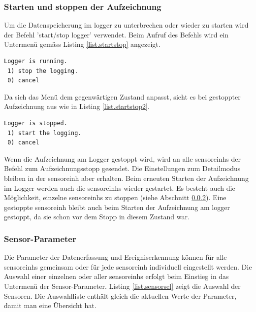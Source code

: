 \begin{lstlisting}[caption=Untermenü Logger-Status, label=list.loggerstatus]

\end{lstlisting}


\subsubsection{Starten und stoppen der Aufzeichnung}\label{sssec.startstop}
Um die Datenspeicherung im \gls{logger} zu unterbrechen oder wieder zu starten wird der Befehl 'start/stop logger' verwendet. Beim Aufruf des Befehls wird ein Untermenü gemäss Listing \ref{list.startstop} angezeigt.

\begin{lstlisting}[caption=Untermenü Stoppen der Aufzeichnung, label=list.startstop1]
 Logger is running.
 1) stop the logging.
 0) cancel
\end{lstlisting}

Da sich das Menü dem gegenwärtigen Zustand anpasst, sieht es bei gestoppter Aufzeichnung aus wie in Listing \ref{list.startstop2}.

\begin{lstlisting}[caption=Untermenü Starten der Aufzeichnung, label=list.startstop2]
 Logger is stopped.
 1) start the logging.
 0) cancel
\end{lstlisting}

Wenn die Aufzeichnung am Logger gestoppt wird, wird an alle \glspl{sensoreinh} der Befehl zum Aufzeichnungsstopp gesendet. Die Einstellungen zum Detailmodus bleiben in der \gls{sensoreinh} aber erhalten. Beim erneuten Starten der Aufzeichnung im Logger werden auch die \glspl{sensoreinh} wieder gestartet. Es besteht auch die Möglichkeit, einzelne \glspl{sensoreinh} zu stoppen (siehe Abschnitt \ref{sssec.sensorparam}). Eine gestoppte \gls{sensoreinh} bleibt auch beim Starten der Aufzeichnung am \gls{logger} gestoppt, da sie schon vor dem Stopp in diesem Zustand war.

\subsubsection{Sensor-Parameter}\label{sssec.sensorparam}
Die Parameter der Datenerfassung und Ereigniserkennung können für alle \glspl{sensoreinh} gemeinsam oder für jede \gls{sensoreinh} individuell eingestellt werden. Die Auswahl einer einzelnen oder aller \glspl{sensoreinh} erfolgt beim Einstieg in das Untermenü der Sensor-Parameter. Listing \ref{list.sensorsel} zeigt die Auswahl der Sensoren. Die Auswahlliste enthält gleich die aktuellen Werte der Parameter, damit man eine Übersicht hat.

